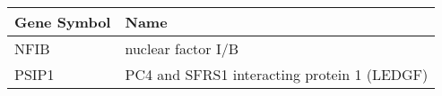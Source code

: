 \begin{tabular}{ll}
\toprule
Gene Symbol &                                        Name \\
\midrule
       NFIB &                          nuclear factor I/B \\
      PSIP1 & PC4 and SFRS1 interacting protein 1 (LEDGF) \\
\bottomrule
\end{tabular}

